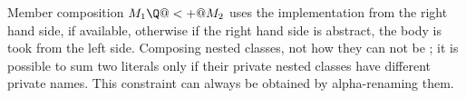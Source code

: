 Member composition $M_1 \Q@<+@ M_2$ uses
the implementation from the right hand side, if available,
otherwise if the right hand side is abstract, the body is took from the left side.
Composing nested classes, not how they can not be \Q@private@; it is possible to sum two literals only if their private nested classes have different private names. This constraint can always be obtained by alpha-renaming them.

